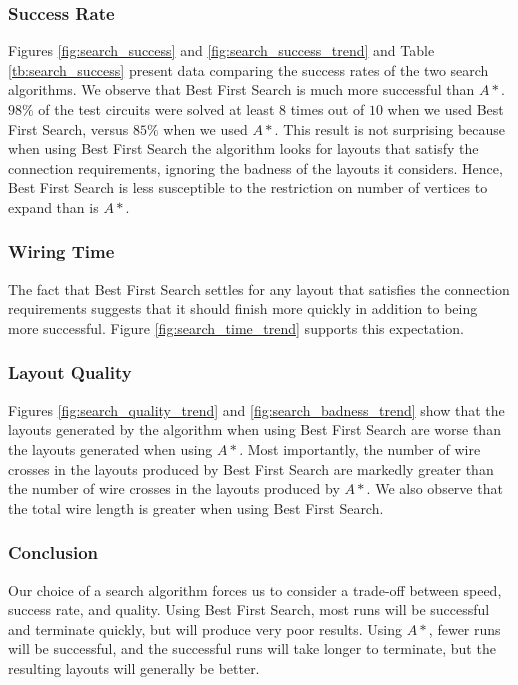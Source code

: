 \subsubsection{Success Rate}
Figures \ref{fig:search_success} and
\ref{fig:search_success_trend} and Table \ref{tb:search_success} present
data comparing the success rates of the two search algorithms.
We observe that Best First Search is much more
successful than $A*$. $98\%$ of the test circuits were solved at least $8$ times
out of $10$ when we used Best First Search, versus $85\%$ when we used $A*$.
This result is not surprising because when using Best First Search the algorithm
looks for layouts that satisfy the connection requirements, ignoring the badness
of the layouts it considers. Hence, Best First Search is less susceptible to the
restriction on number of vertices to expand than is $A*$.

\subsubsection{Wiring Time}
The fact that Best First Search settles for any layout that satisfies the
connection
requirements suggests that it should finish more quickly in addition to being
more successful. Figure \ref{fig:search_time_trend} supports this
expectation.

\subsubsection{Layout Quality}
Figures \ref{fig:search_quality_trend} and \ref{fig:search_badness_trend} show
that the layouts generated by the
algorithm when using Best First Search are worse than the layouts generated
when using $A*$. Most importantly, the
number of wire crosses in the layouts produced by Best First Search are markedly
greater than the number of wire crosses in the layouts produced by $A*$. We also
observe that the total wire length is greater when using Best First Search.

\subsubsection{Conclusion}
Our choice of a search algorithm forces us to consider a trade-off between
speed, success rate, and quality.
Using Best First Search, most runs will be successful
and terminate quickly, but will produce very poor results. Using $A*$,
fewer runs will be successful, and the successful runs will take longer to
terminate, but the resulting layouts will generally be better.


